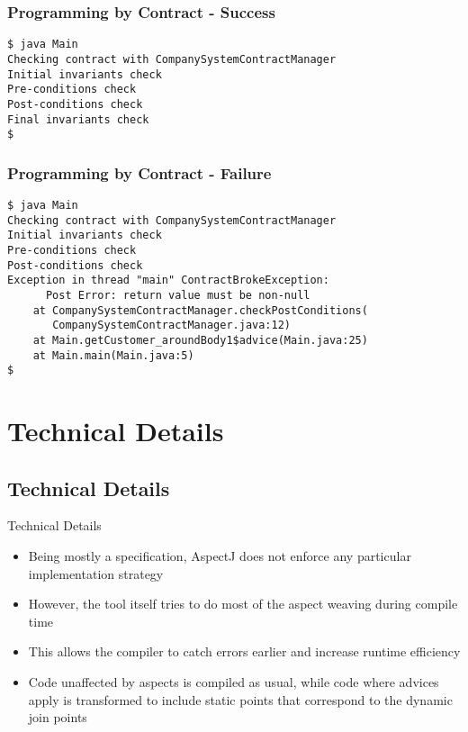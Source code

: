 \documentclass[11pt]{beamer}
\begin{document}
\begin{frame}[fragile]
   \frametitle{Programming by Contract - Success}
{\scriptsize
\begin{lstlisting}
$ java Main
Checking contract with CompanySystemContractManager
Initial invariants check
Pre-conditions check
Post-conditions check
Final invariants check
$ 
\end{lstlisting}}
\end{frame}

\begin{frame}[fragile]
   \frametitle{Programming by Contract - Failure}
{\scriptsize
\begin{lstlisting}
$ java Main
Checking contract with CompanySystemContractManager
Initial invariants check
Pre-conditions check
Post-conditions check
Exception in thread "main" ContractBrokeException:
      Post Error: return value must be non-null
	at CompanySystemContractManager.checkPostConditions(
	   CompanySystemContractManager.java:12)
	at Main.getCustomer_aroundBody1$advice(Main.java:25)
	at Main.main(Main.java:5)
$ 
\end{lstlisting}}
\end{frame}


\section{Technical Details}
\subsection*{Technical Details}

\begin{frame}{Technical Details}
\begin{itemize}
   \item Being mostly a specification, AspectJ does not enforce any particular implementation strategy
   \item However, the tool itself tries to do most of the aspect weaving during compile time
   \item This allows the compiler to catch errors earlier and increase runtime efficiency
   \item Code unaffected by aspects is compiled as usual, while code where advices apply is transformed
   to include static points that correspond to the dynamic join points
\end{itemize}
\end{frame}
\end{document}
